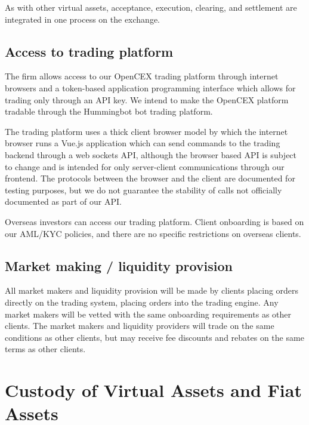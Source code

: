 As with other virtual assets, acceptance, execution, clearing, and
settlement are integrated in one process on the exchange.

\subsection{Access to trading platform}
The firm allows access to our OpenCEX trading platform through internet
browsers and a token-based application programming interface which
allows for trading only through an API key. We intend to make the
OpenCEX platform tradable through the Hummingbot bot trading platform.

The trading platform uses a thick client browser model by which the
internet browser runs a Vue.js application which can send commands to
the trading backend through a web sockets API, although the browser
based API is subject to change and is intended for only server-client
communications through our frontend.  The protocols between the browser
and the client are documented for testing purposes, but we do not
guarantee the stability of calls not officially documented as part of
our API.

Overseas investors can access our trading platform.  Client onboarding
is based on our AML/KYC policies, and there are no specific
restrictions on overseas clients.

\subsection{Market making / liquidity provision}
All market makers and liquidity provision will be made by clients
placing orders directly on the trading system, placing orders into the trading
engine.  Any market makers will be vetted with the same onboarding
requirements as other clients.  The market makers and liquidity
providers will trade on the same conditions as other clients, but may
receive fee discounts and rebates on the same terms as other clients.

\section{Custody of Virtual Assets and Fiat Assets}

